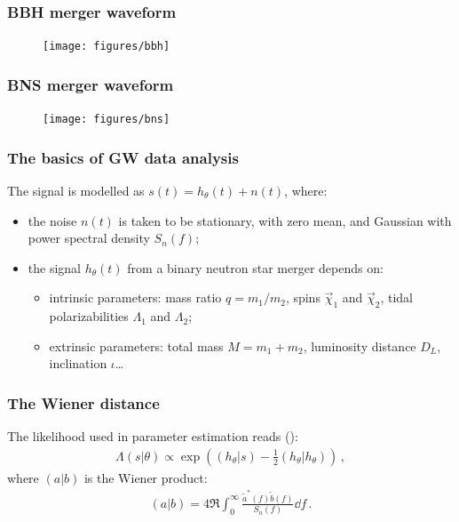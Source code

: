 \documentclass{beamer}
\begin{document}
\begin{frame}
    \frametitle{BBH merger waveform}
    \begin{figure}[ht]
    \centering
    \texttt{[image: figures/bbh]}
    \label{fig:bbh}
    \end{figure}
\end{frame}

\begin{frame}
    \frametitle{BNS merger waveform}
    \begin{figure}[ht]
    \centering
    \texttt{[image: figures/bns]}
    \label{fig:bns}
    \end{figure}
\end{frame}

\begin{frame}
    \frametitle{The basics of GW data analysis}
    The signal is modelled as \(s(t) = h_\theta (t) + n(t)\), where: 
    \begin{itemize}
        \item the noise \(n(t)\) is taken to be stationary, with zero mean, and Gaussian with power spectral density \(S_n(f)\);
        \item the signal \(h_\theta (t)\) from a binary neutron star merger depends on: 
        \begin{itemize}
            \item intrinsic parameters: mass ratio \(q = m_1 / m_2 \), spins \(\vec{\chi}_{1}\) and \(\vec{\chi}_2\), tidal polarizabilities \(\Lambda_1\) and \(\Lambda_2 \);
            \item extrinsic parameters: total mass \(M = m_1 + m_2 \), luminosity distance \(D_L\), inclination \(\iota \)\dots
        \end{itemize}
    \end{itemize}
\end{frame}

\begin{frame}
    \frametitle{The Wiener distance}
    
    The likelihood used in parameter estimation reads (\cite[]{maggioreGravitationalWavesVolume2007}): 
    \begin{align}
    \Lambda (s | \theta ) \propto \exp( (h_\theta | s) - \frac{1}{2} (h_\theta | h_\theta ))
    \,,
    \end{align}
    where \((a | b)\) is the Wiener product: 
    \begin{align}
    (a | b) = 4 \Re \int_{0}^{\infty } \frac{\widetilde{a}^{*}(f) \widetilde{b} (f)}{S_n (f)} \dd{f}
    \,.
    \end{align}
\end{frame}
\end{document}
